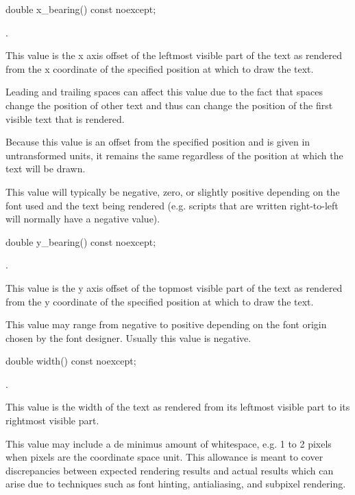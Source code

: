 \begin{itemdecl}
    double x_bearing() const noexcept;
\end{itemdecl}
\begin{itemdescr}
	\pnum
	\returns
	.
	
	\pnum
	\remarks
	This value is the x axis offset of the leftmost visible part of the text as rendered from the x coordinate of the specified position at which to draw the text.
	
	\pnum
	Leading and trailing spaces can affect this value due to the fact that spaces change the position of other text and thus can change the position of the first visible text that is rendered. 

	\pnum
	\enternote
	Because this value is an offset from the specified position and is given in untransformed units, it remains the same regardless of the position at which the text will be drawn.
	
	\pnum
	This value will typically be negative, zero, or slightly positive depending on the font used and the text being rendered (e.g. scripts that are written right-to-left will normally have a negative  value).
	\exitnote
\end{itemdescr}

\begin{itemdecl}
    double y_bearing() const noexcept;
\end{itemdecl}
\begin{itemdescr}
	\pnum
	\returns
	.
	
	\pnum
	\remarks
	This value is the y axis offset of the topmost visible part of the text as rendered from the y coordinate of the specified position at which to draw the text. 

	\pnum
	\enternote
	This value may range from negative to positive depending on the font origin chosen by the font designer. Usually this value is negative.
	\exitnote
\end{itemdescr}

\begin{itemdecl}
    double width() const noexcept;
\end{itemdecl}
\begin{itemdescr}
	\pnum
	\returns
	.
	
	\pnum
	\remarks
	This value is the width of the text as rendered from its leftmost visible part to its rightmost visible part.
	
	\pnum
	This value may include a de minimus amount of whitespace, e.g. 1 to 2 pixels when pixels are the coordinate space unit. This allowance is meant to cover discrepancies between expected rendering results and actual results which can arise due to techniques such as font hinting, antialiasing, and subpixel rendering.

\end{itemdescr}

